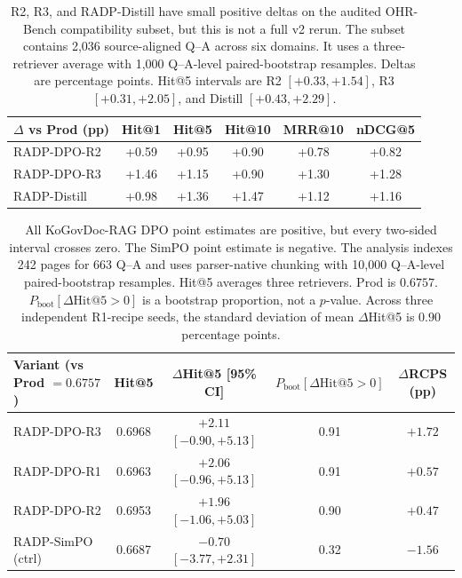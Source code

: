 \documentclass[11pt]{article}
\newcommand{\rcps}{\textnormal{\textsc{RCPS}}}
\begin{document}
\begin{table}[t]
\centering\small
\setlength{\tabcolsep}{4pt}
\begin{tabular}{lccccc}
\toprule
$\Delta$ vs Prod (pp) & Hit@1 & Hit@5 & Hit@10 & MRR@10 & nDCG@5 \\
\midrule
RADP-DPO-R2 & +0.59 & +0.95 & +0.90 & +0.78 & +0.82 \\
RADP-DPO-R3 & +1.46 & +1.15 & +0.90 & +1.30 & +1.28 \\
RADP-Distill & +0.98 & +1.36 & +1.47 & +1.12 & +1.16 \\
\bottomrule
\end{tabular}
\caption{R2, R3, and RADP-Distill have small positive deltas on the audited OHR-Bench compatibility subset, but this is not a full v2 rerun. The subset contains 2{,}036 source-aligned Q--A across six domains. It uses a three-retriever average with 1{,}000 Q--A-level paired-bootstrap resamples. Deltas are percentage points. Hit@5 intervals are R2 $[+0.33,+1.54]$, R3 $[+0.31,+2.05]$, and Distill $[+0.43,+2.29]$.}
\label{tab:ohr}
\end{table}

\begin{table}[t]
\centering\small
\setlength{\tabcolsep}{3pt}
\begin{tabular}{lcccc}
\toprule
Variant (vs Prod $=0.6757$) & Hit@5 & $\Delta$Hit@5 [95\% CI] & $P_\text{boot}[\Delta\mathrm{Hit@5}{>}0]$ & $\Delta$\rcps{} (pp) \\
\midrule
RADP-DPO-R3 & 0.6968 & $+2.11$ $[{-}0.90, {+}5.13]$ & 0.91 & $+1.72$ \\
RADP-DPO-R1 & 0.6963 & $+2.06$ $[{-}0.96, {+}5.13]$ & 0.91 & $+0.57$ \\
RADP-DPO-R2 & 0.6953 & $+1.96$ $[{-}1.06, {+}5.03]$ & 0.90 & $+0.47$ \\
RADP-SimPO (ctrl) & 0.6687 & $-0.70$ $[{-}3.77, {+}2.31]$ & 0.32 & $-1.56$ \\
\bottomrule
\end{tabular}
\caption{All KoGovDoc-RAG DPO point estimates are positive, but every two-sided interval crosses zero. The SimPO point estimate is negative. The analysis indexes 242 pages for 663 Q--A and uses parser-native chunking with 10{,}000 Q--A-level paired-bootstrap resamples. Hit@5 averages three retrievers. Prod is $0.6757$. $P_\text{boot}[\Delta\mathrm{Hit@5}>0]$ is a bootstrap proportion, not a $p$-value. Across three independent R1-recipe seeds, the standard deviation of mean $\Delta$Hit@5 is $0.90$ percentage points.}
\label{tab:kogov}
\end{table}
\end{document}
